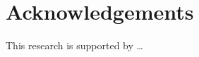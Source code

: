 \documentclass{pbml}
\begin{document}

\section*{Acknowledgements}
This research is supported by \ldots




\correspondingaddress
\end{document}
